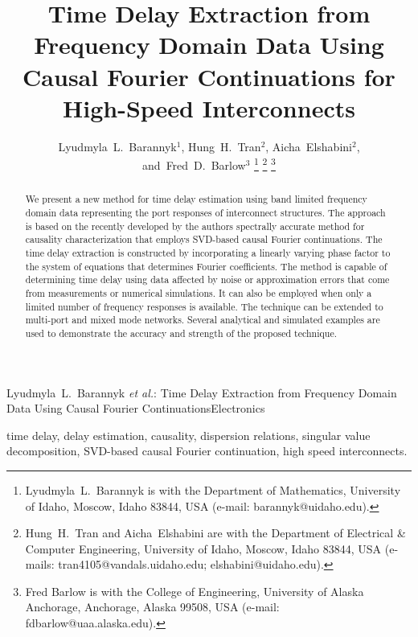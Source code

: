 \documentclass[journal,twoside]{IEEEtran}
\begin{document}
\title{Time Delay Extraction from Frequency Domain Data Using Causal Fourier Continuations 
for High-Speed Interconnects
}

\markboth
{Lyudmyla~L.~Barannyk \MakeLowercase{\textit{et al.}}: Time Delay Extraction from Frequency Domain Data Using Causal Fourier Continuations}{Electronics}

\author{Lyudmyla~L.~Barannyk${}^{1}$,
Hung~H.~Tran${}^2$, 
        Aicha~Elshabini${}^2$,
        and~Fred~D.~Barlow${}^3$
\thanks{Lyudmyla~L.~Barannyk is 
with the Department of Mathematics, University of Idaho, Moscow, Idaho 83844, USA (e-mail: barannyk@uidaho.edu).}
\thanks{Hung~H.~Tran and Aicha~Elshabini are with the Department of Electrical \& Computer Engineering, University of Idaho, Moscow, Idaho 83844, USA (e-mails: tran4105@vandals.uidaho.edu; elshabini@uidaho.edu).}
\thanks{Fred Barlow is with the College of Engineering,  University of Alaska Anchorage, Anchorage, Alaska 99508, USA (e-mail: fdbarlow@uaa.alaska.edu).}
}

\maketitle

\begin{abstract}

We present a new method for time delay estimation using band limited frequency domain data representing the port responses of interconnect structures. The approach is based on the recently developed by the authors spectrally accurate method for causality characterization that employs SVD-based causal Fourier continuations. The time delay extraction  is constructed by incorporating a linearly varying phase factor to the system of equations that determines Fourier coefficients. 
The method is capable of determining time delay using data affected by noise or approximation errors that come from measurements or numerical simulations. It can also be employed when only a limited number of frequency responses is available. The technique can be extended to multi-port and mixed mode networks. Several analytical and simulated examples are used to demonstrate the accuracy and strength of the proposed technique. 

\end{abstract}

\begin{IEEEkeywords}
time delay, delay estimation, causality, dispersion relations, singular value decomposition, SVD-based causal Fourier continuation, high speed interconnects.
\end{IEEEkeywords}
\end{document}
